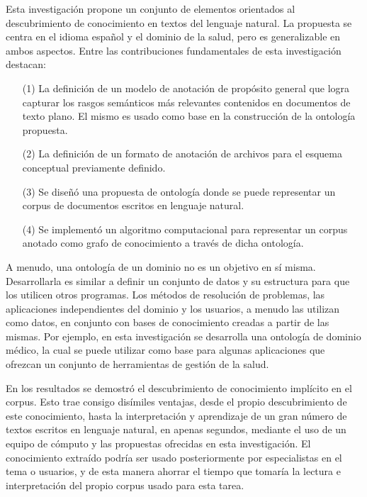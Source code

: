 \label{chapter:conclusions}

Esta investigación propone un conjunto de elementos orientados al descubrimiento de conocimiento en textos del lenguaje natural. La propuesta se centra en el idioma español y el dominio de la salud, pero es generalizable en ambos aspectos. Entre las contribuciones fundamentales de esta investigación destacan:

\begin{itemize}
	\item[(1)] La definición de un modelo de anotación de propósito general que logra capturar los rasgos semánticos más relevantes contenidos en documentos de texto plano. El mismo es usado como base en la construcción de la ontología propuesta.
	\item[(2)] La definición de un formato de anotación de archivos para el esquema conceptual previamente definido.
	\item[(3)] Se diseñó una propuesta de ontología donde se puede representar un corpus de documentos escritos en lenguaje natural.
	\item[(4)] Se implementó un algoritmo computacional para representar un corpus anotado como grafo de conocimiento a través de dicha ontología.
\end{itemize}

A menudo, una ontología de un dominio no es un objetivo en sí misma. Desarrollarla es similar a definir un conjunto de datos y su estructura para que los utilicen otros programas. Los métodos de resolución de problemas, las aplicaciones independientes del dominio y los usuarios, a menudo las utilizan como datos, en conjunto con bases de conocimiento creadas a partir de las mismas. Por ejemplo, en esta investigación se desarrolla una ontología de dominio médico, la cual se puede utilizar como base para algunas aplicaciones que ofrezcan un conjunto de herramientas de gestión de la salud.

En los resultados se demostró el descubrimiento de conocimiento implícito en el corpus. Esto trae consigo disímiles ventajas, desde el propio descubrimiento de este conocimiento, hasta la interpretación y aprendizaje de un gran número de textos escritos en lenguaje natural, en apenas segundos, mediante el uso de un equipo de cómputo y las propuestas ofrecidas en esta investigación. El conocimiento extraído podría ser usado posteriormente por especialistas en el tema o usuarios, y de esta manera ahorrar el tiempo que tomaría la lectura e interpretación del propio corpus usado para esta tarea.

